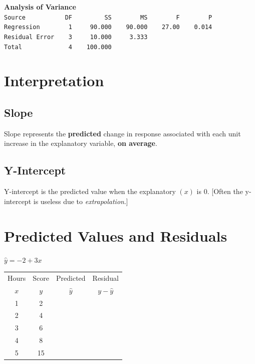 \documentclass[hidelinks,9pt, oneside]{extarticle}     %
\begin{document}
{\bf Analysis of Variance}\\
\verb|Source           DF         SS        MS        F        P|\\
\verb|Regression        1     90.000    90.000    27.00    0.014|\\
\verb|Residual Error    3     10.000     3.333|\\
\verb|Total             4    100.000|\\

\vspace{3in}
\section{Interpretation} %
\label{sub:interpretation}
\subsection{Slope}
Slope represents the  \textbf{predicted} change in response associated with each unit increase in the explanatory variable, \textbf{on average}.\\[.25in]
\subsection{Y-Intercept}
Y-intercept is the predicted value when the explanatory $(x)$ is 0. [Often the y-intercept is useless due to \textit{extrapolation}.]


\newpage


\section{Predicted Values and Residuals}
  $\hat{y}=-2+3x$
  \begin{table}[ht]
  \Huge
  \begin{tabular*}{6cm}[h]{cccc}
  Hours & Score & Predicted & Residual\\
  $x$ & $y$ & $\hat{y}$ & $y-\hat{y}$\\
  1 & 2 & \quad & \\
  2 & 4 & \quad & \\
  3 & 6 & \quad & \\
  4 & 8 & \quad & \\
  5 & 15 & \quad &
  \end{tabular*}
  \end{table}
\end{document}
